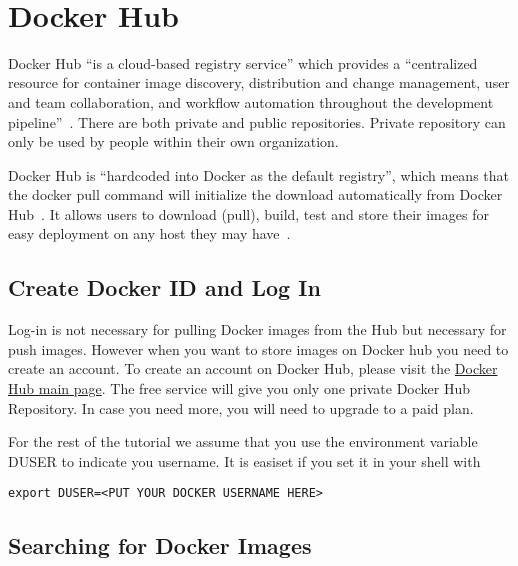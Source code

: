 \FILENAME\



\section{Docker Hub}

\label{s:dockerhub}

Docker Hub ``is a cloud-based registry service'' which provides a 
``centralized resource for container image discovery, distribution and 
change management, user and team collaboration, and workflow automation 
throughout the development 
pipeline''~\cite{hid-sp18-405-tutorial-dockerhub-overview}. There are both 
private and public repositories. Private repository can only be used by people 
within their own organization.

Docker Hub is ``hardcoded into Docker as the default registry'', which means 
that the docker pull command will initialize the download automatically from 
Docker Hub~\cite{hid-sp18-405-tutorial-dockerhub-blog-use}. It allows users 
to download (pull), build, test and store their images for easy deployment on 
any host they may have~\cite{hid-sp18-405-tutorial-dockerhub-overview}.


\subsection{Create Docker ID and Log In }

Log-in is not necessary for pulling Docker images from the Hub but 
necessary for push images. However when you want to store images on 
Docker hub you need to create an account.  To create an account on Docker 
Hub, please visit the \href{https://hub.docker.com/}{Docker Hub main page}. 
The free service will give you only one private Docker Hub Repository. In case 
you need more, you will need to upgrade to a paid plan.

For the rest of the tutorial we assume that you use the environment
variable DUSER to indicate you username. It is easiset if you set it
in your shell with

\begin{lstlisting}
export DUSER=<PUT YOUR DOCKER USERNAME HERE> 
\end{lstlisting}

\subsection{Searching for Docker Images}

